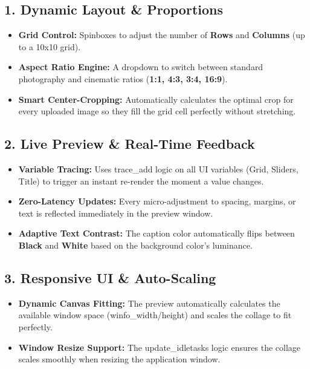 \documentclass[a4paper]{article}
\begin{document}
\subsection*{1. Dynamic Layout \& Proportions}
\begin{itemize}
    \item \textbf{Grid Control:} Spinboxes to adjust the number of \textbf{Rows} and \textbf{Columns} (up to a 10x10 grid).
    \item \textbf{Aspect Ratio Engine:} A dropdown to switch between standard photography and cinematic ratios (\textbf{1:1, 4:3, 3:4, 16:9}).
    \item \textbf{Smart Center-Cropping:} Automatically calculates the optimal crop for every uploaded image so they fill the grid cell perfectly without stretching.
\end{itemize}

\subsection*{2. Live Preview \& Real-Time Feedback}
\begin{itemize}
    \item \textbf{Variable Tracing:} Uses trace\_add logic on all UI variables (Grid, Sliders, Title) to trigger an instant re-render the moment a value changes.
    \item \textbf{Zero-Latency Updates:} Every micro-adjustment to spacing, margins, or text is reflected immediately in the preview window.
    \item \textbf{Adaptive Text Contrast:} The caption color automatically flips between \textbf{Black} and \textbf{White} based on the background color's luminance.
\end{itemize}

\subsection*{3. Responsive UI \& Auto-Scaling}
\begin{itemize}
    \item \textbf{Dynamic Canvas Fitting:} The preview automatically calculates the available window space (winfo\_width/height) and scales the collage to fit perfectly.
    \item \textbf{Window Resize Support:} The update\_idletasks logic ensures the collage scales smoothly when resizing the application window.
\end{itemize}
\end{document}
